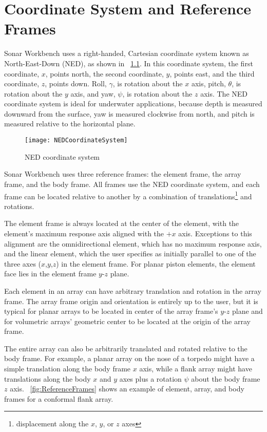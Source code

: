 \chapter{Coordinate System and Reference Frames}\label{ch:coord}
Sonar Workbench uses a right-handed, Cartesian coordinate system known as North-East-Down (NED), as shown in \figname~\ref{fig:NED}. In this coordinate system, the first coordinate, $x$, points north, the second coordinate, $y$, points east, and the third coordinate, $z$, points down. Roll, $\gamma$, is rotation about the $x$ axis, pitch, $\theta$, is rotation about the $y$ axis, and yaw, $\psi$, is rotation about the $z$ axis. The NED coordinate system is ideal for underwater applications, because depth is measured downward from the surface, yaw is measured clockwise from north, and pitch is measured relative to the horizontal plane.

\begin{figure}[!ht]
\begin{center}
\texttt{[image: NEDCoordinateSystem]}
\caption{\label{fig:NED}NED coordinate system}
\end{center}
\end{figure}

Sonar Workbench uses three reference frames: the element frame, the array frame, and the body frame. All frames use the NED coordinate system, and each frame can be located relative to another by a combination of translations\footnote{displacement along the $x$, $y$, or $z$ axes} and rotations.

The element frame is always located at the center of the element, with the element's maximum response axis aligned with the $+x$ axis. Exceptions to this alignment are the omnidirectional element, which has no maximum response axis, and the linear element, which the user specifies as initially parallel to one of the three axes ($x$,$y$,$z$) in the element frame. For planar piston elements, the element face lies in the element frame $y$-$z$ plane.

Each element in an array can have arbitrary translation and rotation in the array frame. The array frame origin and orientation is entirely up to the user, but it is typical for planar arrays to be located in center of the array frame's $y$-$z$ plane and for volumetric arrays' geometric center to be located at the origin of the array frame.

The entire array can also be arbitrarily translated and rotated relative to the body frame. For example, a planar array on the nose of a torpedo might have a simple translation along the body frame $x$ axis, while a flank array might have translations along the body $x$ and $y$ axes plus a rotation $\psi$ about the body frame $z$ axis. \figurename~\ref{fig:ReferenceFrames} shows an example of element, array, and body frames for a conformal flank array.

